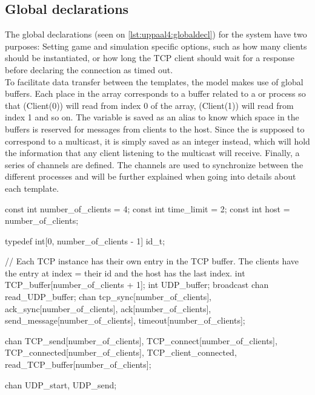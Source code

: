 \subsection*{Global declarations}
The global declarations (seen on \autoref{lst:uppaal4:globaldecl}) for the system have two purposes: Setting game and simulation specific options, such as how many clients should be instantiated, or how long the TCP client should wait for a response before declaring the connection as timed out.
\\
To facilitate data transfer between the templates, the model makes use of global buffers.
Each place in the  array corresponds to a buffer related to a  or  process so that \uppProc(Client(0)) will read from index 0 of the array, \uppProc(Client(1)) will read from index 1 and so on.
The  variable is saved as an alias to know which space in the buffers is reserved for messages from clients to the host.
Since the  is supposed to correspond to a multicast, it is simply saved as an integer instead, which will hold the information that any client listening to the multicast will receive. 
Finally, a series of channels are defined.
The channels are used to synchronize between the different processes and will be further explained when going into details about each template.

\begin{uppaalcode}[caption={Global declarations}, label={lst:uppaal4:globaldecl},captionpos=b]
const int number_of_clients = 4;
const int time_limit = 2;
const int host = number_of_clients;

typedef int[0, number_of_clients - 1] id_t;

// Each TCP instance has their own entry in the TCP buffer. The clients have the entry at index = their id and the host has the last index.
int TCP_buffer[number_of_clients + 1];
int UDP_buffer;
broadcast chan read_UDP_buffer;
chan tcp_sync[number_of_clients], ack_sync[number_of_clients], ack[number_of_clients], send_message[number_of_clients], timeout[number_of_clients];

chan TCP_send[number_of_clients], TCP_connect[number_of_clients], TCP_connected[number_of_clients], TCP_client_connected, read_TCP_buffer[number_of_clients];

chan UDP_start, UDP_send;
\end{uppaalcode}

